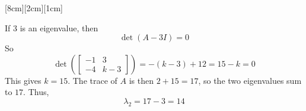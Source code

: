 \documentclass[11pt]{article}
\begin{document}
\begin{prob}[(12 pts)]
\begin{subprob}
  [8cm][2cm][1cm]
\begin{solution}
If $3$ is an eigenvalue, then
\[
\det(A-3I)=0
\]
So
\[
\det\left(
\begin{bmatrix}
-1 & 3\\
-4 & k-3
\end{bmatrix}
\right)
=
-(k-3)+12
=
15-k
=0
\]
This gives $k=15$. The trace of $A$ is then $2+15=17$, so the two eigenvalues sum to $17$. Thus,
\[
\lambda_2 = 17-3 = \boxed{14}
\]
\end{solution}
\end{subprob}







  

  
\end{prob}
\end{document}

